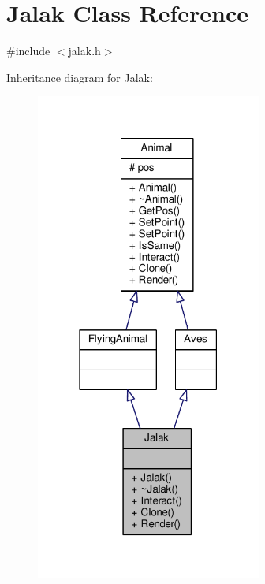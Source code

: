 \hypertarget{classJalak}{}\section{Jalak Class Reference}
\label{classJalak}


{\ttfamily \#include $<$jalak.\+h$>$}



Inheritance diagram for Jalak\+:
\nopagebreak
\begin{figure}[H]
\begin{center}
\leavevmode
\includegraphics[width=210pt]{classJalak__inherit__graph}
\end{center}
\end{figure}


